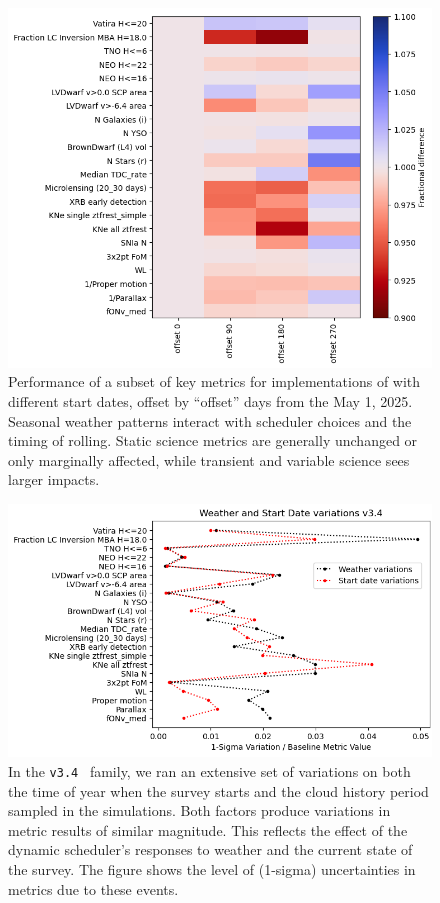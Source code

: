 \begin{figure}
    \centering
    \includegraphics[width=0.9\linewidth]{figures/start_date_scoc_heatmap.png}
    \caption{Performance of a subset of key metrics for implementations of  with different start dates, offset by ``offset'' days from the May 1, 2025. Seasonal weather patterns interact with scheduler choices and the timing of rolling. Static science metrics are generally unchanged or only marginally affected, while transient and variable science sees larger impacts. }
    \label{fig:start_dates}
\end{figure}


\begin{figure}
    \centering
    \includegraphics[width=0.85\linewidth]{figures/uncertainties_v3_4.png}
    \caption{In the \texttt{v3.4} \opsim\ family, we ran an extensive set of variations on both the time of year when the survey starts and the cloud history period sampled in the simulations. Both factors produce variations in metric results of similar magnitude. This reflects the effect of the dynamic scheduler's responses to weather and the current state of the survey. The figure shows the level of (1-sigma) uncertainties in metrics due to these events.} %
    \label{fig:startdates_weather}
\end{figure}
\clearpage
